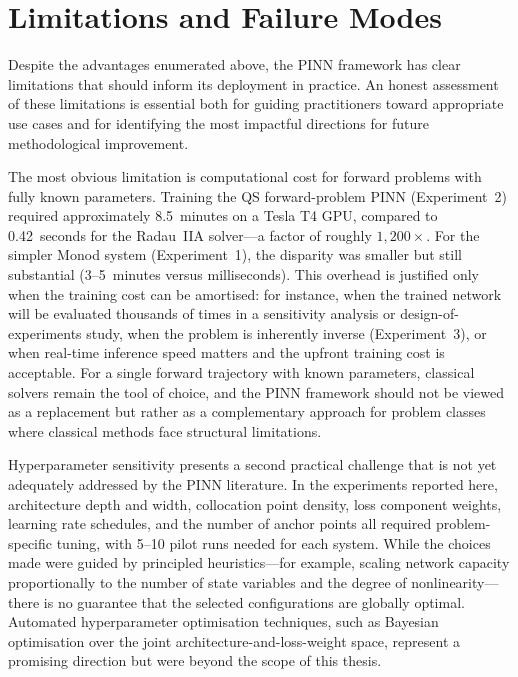 \documentclass[14pt,a4paper,openany]{extbook}
\begin{document}
\section{Limitations and Failure Modes}
\label{sec:limitations_disc}

Despite the advantages enumerated above, the PINN framework has clear limitations that should inform its deployment in practice. An honest assessment of these limitations is essential both for guiding practitioners toward appropriate use cases and for identifying the most impactful directions for future methodological improvement.

The most obvious limitation is computational cost for forward problems with fully known parameters. Training the QS forward-problem PINN (Experiment~2) required approximately 8.5~minutes on a Tesla T4 GPU, compared to 0.42~seconds for the Radau~IIA solver---a factor of roughly $1{,}200\times$. For the simpler Monod system (Experiment~1), the disparity was smaller but still substantial (3--5~minutes versus milliseconds). This overhead is justified only when the training cost can be amortised: for instance, when the trained network will be evaluated thousands of times in a sensitivity analysis or design-of-experiments study, when the problem is inherently inverse (Experiment~3), or when real-time inference speed matters and the upfront training cost is acceptable. For a single forward trajectory with known parameters, classical solvers remain the tool of choice, and the PINN framework should not be viewed as a replacement but rather as a complementary approach for problem classes where classical methods face structural limitations.

Hyperparameter sensitivity presents a second practical challenge that is not yet adequately addressed by the PINN literature. In the experiments reported here, architecture depth and width, collocation point density, loss component weights, learning rate schedules, and the number of anchor points all required problem-specific tuning, with 5--10 pilot runs needed for each system. While the choices made were guided by principled heuristics---for example, scaling network capacity proportionally to the number of state variables and the degree of nonlinearity---there is no guarantee that the selected configurations are globally optimal. Automated hyperparameter optimisation techniques, such as Bayesian optimisation over the joint architecture-and-loss-weight space, represent a promising direction but were beyond the scope of this thesis.
\end{document}

